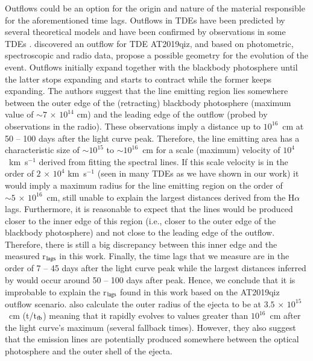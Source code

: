 \documentclass[structabstract]{aa}
\begin{document}
Outflows could be an option for the origin and nature of the material responsible for the aforementioned time lags. Outflows in TDEs have been predicted by several theoretical models \citep{Strubbe2009,Metzger2016,Roth2016,Roth2017,Dai2018} and have been confirmed by observations in some TDEs \citep[e.g.,][]{Alexander2016,Hung2019,Nicholl2020}. \citet{Nicholl2020} discovered an outflow for TDE AT2019qiz, and based on photometric, spectroscopic and radio data, propose a possible geometry for the evolution of the event. Outflows initially expand together with the blackbody photosphere until the latter stops expanding and starts to contract while the former keeps expanding. The authors suggest that the line emitting region lies somewhere between the outer edge of the (retracting) blackbody photosphere (maximum value of $\sim 7\,\times\,10^{14}$ cm) and the leading edge of the outflow (probed by observations in the radio). 
These observations imply a distance up to $10^{16}$~cm at 50 -- 100 days after the light curve peak. Therefore, the line emitting area has a characteristic size of $\sim$$10^{15}$ to $\sim$$10^{16}$~cm for a scale (maximum) velocity of $10^{4}$~km~s$^{-1}$ derived from fitting the spectral lines. If this scale velocity is in the order of $2\,\times\,10^{4}$ km~s$^{-1}$ (seen in many TDEs as we have shown in our work) it would imply a maximum radius for the line emitting region on the order of $\sim 5\,\times\,10^{16}$~cm, still unable to explain the largest distances derived from the H$\alpha$ lags. 
Furthermore, it is reasonable to expect that the lines would be produced closer to the inner edge of this region (i.e., closer to the outer edge of the blackbody photosphere) and not close to the leading edge of the outflow. Therefore, there is still a big discrepancy between this inner edge and the measured r$_{\rm lags}$ in this work.
Finally, the time lags that we measure are in the order of 7 -- 45 days after the light curve peak while the largest distances inferred by \citet{Nicholl2020} would occur around 50 -- 100 days after peak.
Hence, we conclude that it is improbable to explain the r$_{\rm lags}$ found in this work based on the AT2019qiz outflow scenario.
\citet{Metzger2016} also calculate the outer radius of the ejecta to be at $3.5\,\times\,10^{15}$~cm (t/t$_{\rm fb}$) meaning that it rapidly evolves to values greater than $10^{16}$~cm after the light curve's maximum (several fallback times). However, they also suggest that the emission lines are potentially produced somewhere between the optical photosphere and the outer shell of the ejecta.
\end{document}
